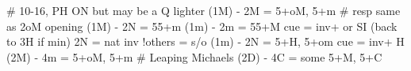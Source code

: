 # 10-16, PH ON but may be a Q lighter
(1M) - 2M = 5+oM, 5+m  # resp same as 2oM opening
(1M) - 2N = 55+m
(1m) - 2m = 55+M
    cue = inv+ or SI (back to 3H if min)
    2N = nat inv
    !others = s/o
(1m) - 2N = 5+H, 5+om
    cue = inv+ H
(2M) - 4m = 5+oM, 5+m  # Leaping Michaels
(2D) - 4C = some 5+M, 5+C
